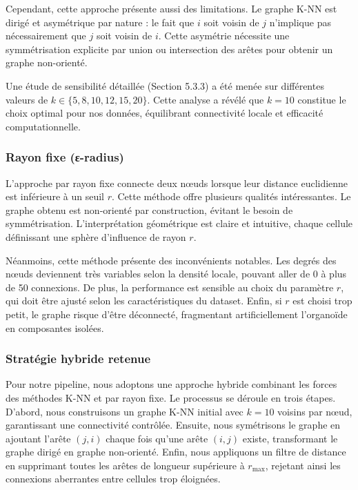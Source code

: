Cependant, cette approche présente aussi des limitations. Le graphe K-NN est dirigé et asymétrique par nature : le fait que $i$ soit voisin de $j$ n'implique pas nécessairement que $j$ soit voisin de $i$. Cette asymétrie nécessite une symmétrisation explicite par union ou intersection des arêtes pour obtenir un graphe non-orienté.

Une étude de sensibilité détaillée (Section 5.3.3) a été menée sur différentes valeurs de $k \in \{5, 8, 10, 12, 15, 20\}$. Cette analyse a révélé que $k = 10$ constitue le choix optimal pour nos données, équilibrant connectivité locale et efficacité computationnelle.

\subsubsection{Rayon fixe (ε-radius)}

L'approche par rayon fixe connecte deux nœuds lorsque leur distance euclidienne est inférieure à un seuil $r$. Cette méthode offre plusieurs qualités intéressantes. Le graphe obtenu est non-orienté par construction, évitant le besoin de symmétrisation. L'interprétation géométrique est claire et intuitive, chaque cellule définissant une sphère d'influence de rayon $r$.

Néanmoins, cette méthode présente des inconvénients notables. Les degrés des nœuds deviennent très variables selon la densité locale, pouvant aller de 0 à plus de 50 connexions. De plus, la performance est sensible au choix du paramètre $r$, qui doit être ajusté selon les caractéristiques du dataset. Enfin, si $r$ est choisi trop petit, le graphe risque d'être déconnecté, fragmentant artificiellement l'organoïde en composantes isolées.

\subsubsection{Stratégie hybride retenue}

Pour notre pipeline, nous adoptons une approche hybride combinant les forces des méthodes K-NN et par rayon fixe. Le processus se déroule en trois étapes. D'abord, nous construisons un graphe K-NN initial avec $k = 10$ voisins par nœud, garantissant une connectivité contrôlée. Ensuite, nous symétrisons le graphe en ajoutant l'arête $(j,i)$ chaque fois qu'une arête $(i,j)$ existe, transformant le graphe dirigé en graphe non-orienté. Enfin, nous appliquons un filtre de distance en supprimant toutes les arêtes de longueur supérieure à $r_{\max}$, rejetant ainsi les connexions aberrantes entre cellules trop éloignées.

